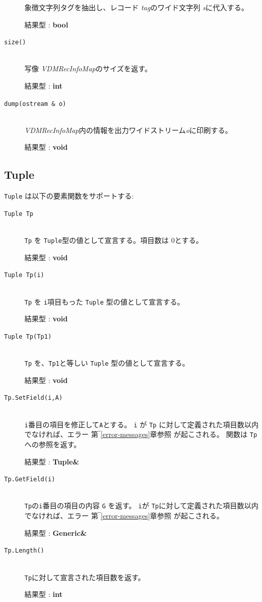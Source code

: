 \documentclass[\pformat,12pt]{jarticle}
\begin{document}
\begin{description}
  象徴文字列タグを抽出し、レコード {\em tag}のワイド文字列 {\em s}に代入する。

  結果型 : {\bf bool}

\item[{\tt size()}]  \mbox{}\\

  写像 {\em VDMRecInfoMap}のサイズを返す。

  結果型 : {\bf int}

\item[{\tt dump(ostream \& o)}]  \mbox{}\\

   {\em VDMRecInfoMap}内の情報を出力ワイドストリーム{\em o}に印刷する。

  結果型 : {\bf void}

\end{description}


\subsection{Tuple}
{\tt Tuple} は以下の要素関数をサポートする:

\vspace{0.5cm}

\begin{description}
\item[{\tt Tuple Tp}] \mbox{}\\
      {\tt Tp} を {\tt Tuple}型の値として宣言する。項目数は 0とする。

     結果型 : {\bf void}

\item[{\tt Tuple Tp(i)}] \mbox{}\\
     {\tt Tp} を {\tt i}項目もった {\tt Tuple} 型の値として宣言する。

     結果型 : {\bf void}

\item[{\tt Tuple Tp(Tp1)}] \mbox{}\\
      {\tt Tp} を、{\tt Tp1}と等しい {\tt Tuple} 型の値として宣言する。

     結果型 : {\bf void}

\item[{\tt Tp.SetField(i,A)}] \mbox{}\\
     {\tt i}番目の項目を修正して{\tt A}とする。 
 {\tt i} が {\tt Tp} に対して定義された項目数以内でなければ、エラー 第‾\ref{error-messages}章参照 が起こされる。
関数は {\tt Tp}への参照を返す。

     結果型 : {\bf Tuple\&}

\item[{\tt Tp.GetField(i)}] \mbox{}\\
      {\tt Tp}の{\tt i}番目の項目の内容 {\tt G} を返す。
      {\tt i}が {\tt Tp}に対して定義された項目数以内でなければ、エラー 第‾\ref{error-messages}章参照 が起こされる。

     結果型 : {\bf Generic\&}

\item[{\tt Tp.Length()}] \mbox{}\\
      {\tt Tp}に対して宣言された項目数を返す。

     結果型 : {\bf int}
\end{description}
\end{document}
